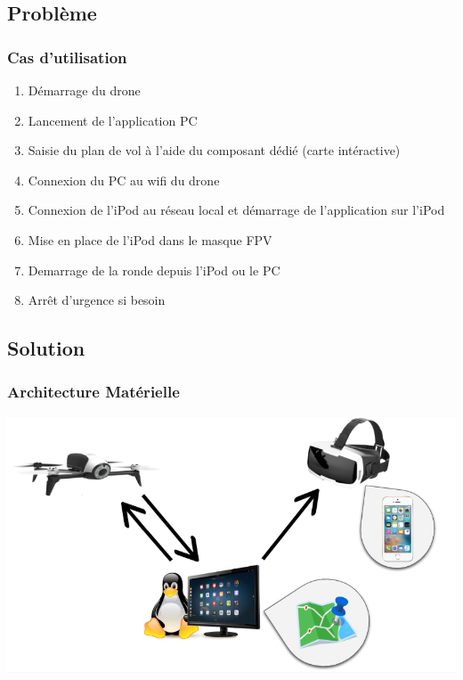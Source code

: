 \documentclass{beamer}
\begin{document}
	\begin{frame}
		\section{Problème}
		\begin{center}
		\frametitle{Cas d'utilisation}
		\begin{enumerate}
		    \item Démarrage du drone\\
		    \item Lancement de l'application PC\\
		    \item Saisie du plan de vol à l'aide du composant dédié (carte intéractive)\\
		    \item Connexion du PC au wifi du drone
		    \item Connexion de l'iPod au réseau local et démarrage de l'application sur l'iPod
		    \item Mise en place de l'iPod dans le masque FPV
		    \item Demarrage de la ronde depuis l'iPod ou le PC
		    \item Arrêt d'urgence si besoin
		\end{enumerate}
		   
		\end{center}
	\end{frame}
	
	\begin{frame}
		\section{Solution}
		\begin{center}
		\frametitle{Architecture Matérielle}
       
        \includegraphics[scale=0.6]{shcema_archi.png}
		\end{center}
	\end{frame}
	
\end{document}

